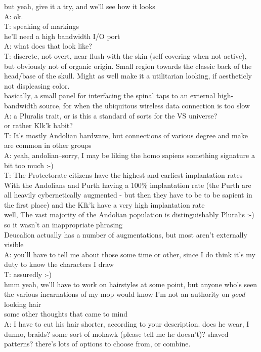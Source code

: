but yeah, give it a try, and we'll see how it looks\\
A: ok.\\
T: speaking of markings\\
he'll need a high bandwidth I/O port\\
A: what does that look like?\\
T: discrete, not overt, near flush with the skin (self covering when not active), but obviously not of organic origin. Small region towards the classic back of the head/base of the skull. Might as well make it a utilitarian looking, if aestheticly not displeasing color.\\
basically, a small panel for interfacing the spinal taps to an external high-bandwidth source, for when the ubiquitous wireless data connection is too slow\\
A: a Pluralis trait, or is this a standard of sorts for the VS universe?\\
or rather Klk'k habit?\\
T: It's mostly Andolian hardware, but connections of various degree and make are common in other groups\\
A: yeah, andolian--sorry, I may be liking the homo sapiens something signature a bit too much :-)\\
T: The Protectorate citizens have the highest and earliest implantation rates\\
With the Andolians and Purth having a 100\% implantation rate (the Purth are all heavily cybernetically augmented - but then they have to be to be sapient in the first place) and the Klk'k have a very high implantation rate\\
well, The vast majority of the Andolian population is distinguishably Pluralis :-)\\
so it wasn't an inappropriate phrasing\\
Deucalion actually has a number of augmentations, but most aren't externally visible\\
A: you'll have to tell me about those some time or other, since I do think it's my duty to know the characters I draw\\
T: assuredly :-)\\
hmm yeah, we'll have to work on hairstyles at some point, but anyone who's seen the various incarnations of my mop would know I'm not an authority on {\em good} looking hair\\
some other thoughts that came to mind\\
A: I have to cut his hair shorter, according to your description. does he wear, I dunno, braids? some sort of mohawk (please tell me he doesn't)? shaved patterns? there's lots of options to choose from, or combine.\\
